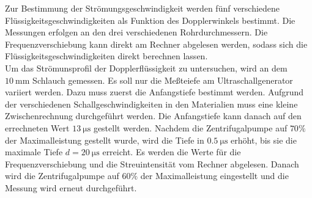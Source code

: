   Zur Bestimmung der Strömungsgeschwindigkeit werden fünf verschiedene Flüssigkeitsgeschwindigkeiten als Funktion des Dopplerwinkels bestimmt. Die Messungen erfolgen an den drei verschiedenen Rohrdurchmessern.
Die Frequenzverschiebung kann direkt am Rechner abgelesen werden, sodass sich die Flüssigkeitsgeschwindigkeiten direkt berechnen lassen.\\
Um das Strömunsprofil der Dopplerflüssigkeit zu untersuchen, wird an dem $\SI{10}{\milli\metre}$ Schlauch gemessen. Es soll nur die Meßteiefe am Ultraschallgenerator variiert werden.
Dazu muss zuerst die Anfangstiefe bestimmt werden. Aufgrund der verschiedenen Schallgeschwindigkeiten in den Materialien muss eine kleine Zwischenrechnung durchgeführt werden.
Die Anfangstiefe kann danach auf den errechneten Wert $\SI{13}{\micro\second}$ gestellt werden. Nachdem die Zentrifugalpumpe auf $70 \si{\percent}$ der Maximalleistung gestellt wurde,
wird die Tiefe in $\SI{0.5}{\micro\second}$ erhöht, bis sie die maximale Tiefe $d=\SI{20}{\micro\second}$ erreicht. Es werden die Werte für die Frequenzverschiebung und die Streuintensität vom Rechner abgelesen.
Danach wird die Zentrifugalpumpe auf $60 \si{\percent}$ der Maximalleistung eingestellt und die Messung wird erneut durchgeführt.